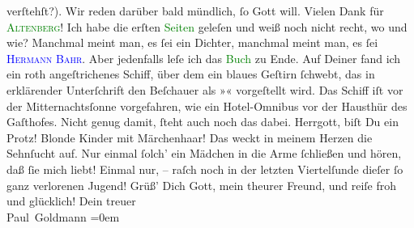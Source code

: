                verſtehſt?). {\pb}Wir reden darüber bald mündlich, ſo
               Gott will.\pend
           \pstart
            Vielen Dank für \textsc{\textcolor{blue}{\textcolor{green}{Altenberg}{}}{}\ledrightnote{\textcolor{blue}{Peter Altenberg}}}! Ich habe die erſten \textcolor{green}{Seiten}{} geleſen und weiß noch nicht recht, wo und wie? Manchmal \strikeout{\textcolor{gray}{man}} meint man, es ſei ein Dichter, manchmal meint man, es ſei \textsc{\textcolor{blue}{Hermann Bahr}{}}. Aber jedenfalls leſe ich das \textcolor{green}{Buch}{} zu Ende.\pend
           \pstart
           Auf Deiner \label{K_L02781-8v}\label{K_L02781-8h} fand ich ein roth angeſtrichenes {\pb}Schiff,
               über dem ein\strikeout{\textcolor{gray}{e}} blaues Geſtirn ſchwebt, das in erklärender Unterſchrift den Beſchauer als
                  »\label{K_L02781-7v}\label{K_L02781-7h}«
               vorgeſtellt wird. Das Schiff iſt vor  der Mitternachtsſonne vorgefahren, wie ein Hotel-Omnibus vor der Hausthür des
               Gaſthofes. Nicht genug damit, ſteht auch noch das \label{K_L02781-987v}\label{K_L02781-987h} dabei. Herrgott, biſt Du ein Protz! {\dotsfour}\pend
           \pstart
           Blonde Kinder mit Märchenhaar! Das weckt {\pb}in meinem
               Herzen die Sehnſucht auf. Nur einmal ſolch’ ein Mädchen in die Arme ſchließen und
               hören, daß ſie mich liebt! Einmal nur, – raſch noch in der letzten Viertelſunde dieſer
               ſo ganz verlorenen Jugend! {\dotsfour}\pend
           \pstart
           Grüß’ Dich Gott, mein theurer Freund, und reiſe froh und glücklich!\pend
           \pstart
           Dein treuer {\\[\baselineskip]}\spacefill\mbox{Paul Goldmann}\pend
           \leftskip=0em{}\endnumbering{}  
      
